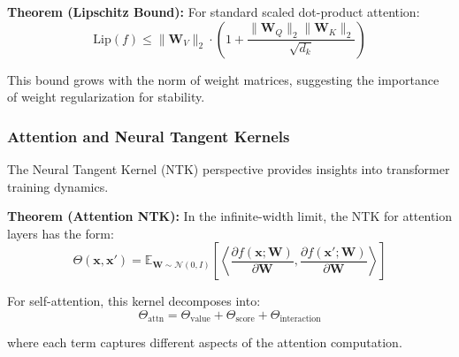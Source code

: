 \textbf{Theorem (Lipschitz Bound):} For standard scaled dot-product attention:
\begin{equation}
\text{Lip}(f) \leq \|\mathbf{W}_V\|_2 \cdot \left(1 + \frac{\|\mathbf{W}_Q\|_2 \|\mathbf{W}_K\|_2}{\sqrt{d_k}}\right)
\end{equation}

This bound grows with the norm of weight matrices, suggesting the importance of weight regularization for stability.

\subsubsection{Attention and Neural Tangent Kernels}

The Neural Tangent Kernel (NTK) perspective provides insights into transformer training dynamics.

\textbf{Theorem (Attention NTK):} In the infinite-width limit, the NTK for attention layers has the form:
\begin{equation}
\Theta(\mathbf{x}, \mathbf{x}') = \mathbb{E}_{\mathbf{W} \sim \mathcal{N}(0, I)}\left[\left\langle \frac{\partial f(\mathbf{x}; \mathbf{W})}{\partial \mathbf{W}}, \frac{\partial f(\mathbf{x}'; \mathbf{W})}{\partial \mathbf{W}} \right\rangle\right]
\end{equation}

For self-attention, this kernel decomposes into:
\begin{equation}
\Theta_{\text{attn}} = \Theta_{\text{value}} + \Theta_{\text{score}} + \Theta_{\text{interaction}}
\end{equation}

where each term captures different aspects of the attention computation.
